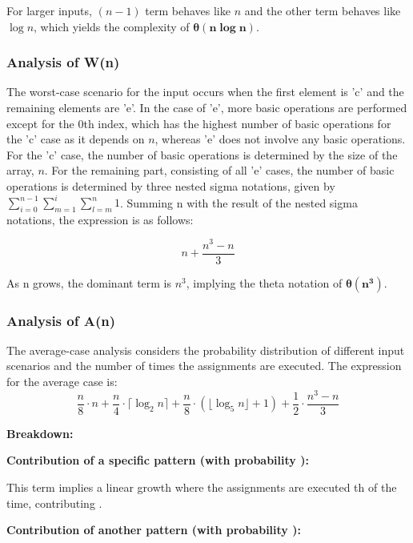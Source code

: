 \documentclass[11pt, oneside, a4paper]{article}
\begin{document}
For larger inputs, \( (n-1) \) term behaves like \( n \) and the other term behaves like \( \log n \), which yields the complexity of \( \boldsymbol{\theta(n \log n)} \).


\subsubsection{Analysis of W(n)}

The worst-case scenario for the input occurs when the first element is 'c' and the remaining elements are 'e'. In the case of 'e', more basic operations are performed except for the 0th index, which has the highest number of basic operations for the 'c' case as it depends on \( n \), whereas 'e' does not involve any basic operations. For the 'c' case, the number of basic operations is determined by the size of the array, \( n \). For the remaining part, consisting of all 'e' cases, the number of basic operations is determined by three nested sigma notations, given by \( \sum_{i=0}^{n-1} \sum_{m=1}^{i} \sum_{l=m}^{n} 1 \). Summing n with the result of the nested sigma notations, the expression is as follows:


\begin{equation*}
n+ \frac{n^3 - n}{3} 
\end{equation*}

As n grows, the dominant term is $n^3$, implying the theta notation of \( \boldsymbol{\theta(n^3)} \).


\subsubsection{Analysis of A(n)}

The average-case analysis considers the probability distribution of different input scenarios and the number of times the assignments are executed. The expression for the average case is:
\begin{equation*}
\frac{n}{8} \cdot n + \frac{n}{4} \cdot \lceil \log_2 n \rceil + \frac{n}{8} \cdot \left( \lfloor \log_5 n \rfloor + 1 \right) + \frac{1}{2} \cdot \frac{n^3 - n}{3}
\end{equation*}

\textbf{Breakdown:}

\textbf{Contribution of a specific pattern (with probability ):}

This term implies a linear growth where the assignments are executed th of the time, contributing .

\textbf{Contribution of another pattern (with probability ):}
\end{document}

